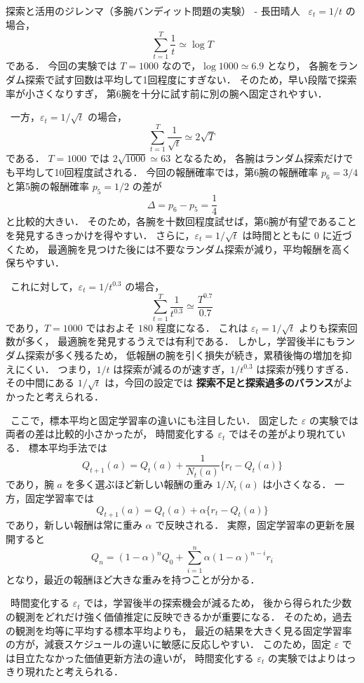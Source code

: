 \begin{column}{探索と活用のジレンマ（多腕バンディット問題の実験） - 長田晴人}
\ $\varepsilon_t=1/t$ の場合，
\[
    \sum_{t=1}^{T}\frac{1}{t}
    \simeq
    \log T
\]
である．
今回の実験では $T=1000$ なので，$\log 1000 \simeq 6.9$ となり，
各腕をランダム探索で試す回数は平均して1回程度にすぎない．
そのため，早い段階で探索率が小さくなりすぎ，
第6腕を十分に試す前に別の腕へ固定されやすい．

\ 一方，$\varepsilon_t=1/\sqrt{t}$ の場合，
\[
    \sum_{t=1}^{T}\frac{1}{\sqrt{t}}
    \simeq
    2\sqrt{T}
\]
である．
$T=1000$ では $2\sqrt{1000}\simeq 63$ となるため，
各腕はランダム探索だけでも平均して10回程度試される．
今回の報酬確率では，第6腕の報酬確率 $p_6=3/4$ と第5腕の報酬確率 $p_5=1/2$ の差が
\[
    \Delta=p_6-p_5=\frac{1}{4}
\]
と比較的大きい．
そのため，各腕を十数回程度試せば，第6腕が有望であることを発見するきっかけを得やすい．
さらに，$\varepsilon_t=1/\sqrt{t}$ は時間とともに $0$ に近づくため，
最適腕を見つけた後には不要なランダム探索が減り，平均報酬を高く保ちやすい．

\ これに対して，$\varepsilon_t=1/t^{0.3}$ の場合，
\[
    \sum_{t=1}^{T}\frac{1}{t^{0.3}}
    \simeq
    \frac{T^{0.7}}{0.7}
\]
であり，$T=1000$ ではおよそ $180$ 程度になる．
これは $\varepsilon_t=1/\sqrt{t}$ よりも探索回数が多く，
最適腕を発見するうえでは有利である．
しかし，学習後半にもランダム探索が多く残るため，
低報酬の腕を引く損失が続き，累積後悔の増加を抑えにくい．
つまり，$1/t$ は探索が減るのが速すぎ，$1/t^{0.3}$ は探索が残りすぎる．
その中間にある $1/\sqrt{t}$ は，今回の設定では
\textbf{探索不足と探索過多のバランス}がよかったと考えられる．

\ ここで，標本平均と固定学習率の違いにも注目したい．
固定した $\varepsilon$ の実験では両者の差は比較的小さかったが，
時間変化する $\varepsilon_t$ ではその差がより現れている．
標本平均手法では
\[
    Q_{t+1}(a)
    =
    Q_t(a)
    +
    \frac{1}{N_t(a)}\{r_t-Q_t(a)\}
\]
であり，腕 $a$ を多く選ぶほど新しい報酬の重み $1/N_t(a)$ は小さくなる．
一方，固定学習率では
\[
    Q_{t+1}(a)
    =
    Q_t(a)
    +
    \alpha\{r_t-Q_t(a)\}
\]
であり，新しい報酬は常に重み $\alpha$ で反映される．
実際，固定学習率の更新を展開すると
\[
    Q_n
    =
    (1-\alpha)^nQ_0
    +
    \sum_{i=1}^{n}\alpha(1-\alpha)^{n-i}r_i
\]
となり，最近の報酬ほど大きな重みを持つことが分かる．

\ 時間変化する $\varepsilon_t$ では，学習後半の探索機会が減るため，
後から得られた少数の観測をどれだけ強く価値推定に反映できるかが重要になる．
そのため，過去の観測を均等に平均する標本平均よりも，
最近の結果を大きく見る固定学習率の方が，減衰スケジュールの違いに敏感に反応しやすい．
このため，固定 $\varepsilon$ では目立たなかった価値更新方法の違いが，
時間変化する $\varepsilon_t$ の実験ではよりはっきり現れたと考えられる．


\end{column}
